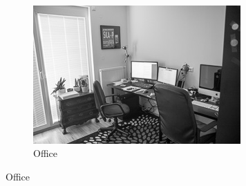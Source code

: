 \documentclass[subfigure,epsfig,fleqn,float,numbers=noenddot]{scrartcl}
\begin{document}
\begin{figure}
\begin{subfigure}[b]{0.3\textwidth}
                \label{fig:livingroom}
        \end{subfigure}
        ~ %
        \begin{subfigure}[b]{0.3\textwidth}
                \includegraphics[width=\textwidth]{img/own/office}
                \caption{Office}
                \label{fig:office}
        \end{subfigure}
				

\end{figure}
\end{document}
